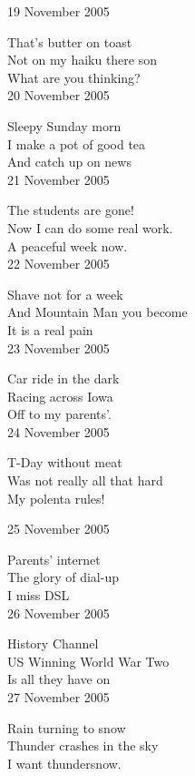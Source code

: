 \documentclass[12pt]{article}
\begin{document}
\newpage


19 November 2005

That's butter on toast \\
Not on my haiku there son \\
What are you thinking? \\

20 November 2005

Sleepy Sunday morn \\
I make a pot of good tea \\
And catch up on news \\

21 November 2005

The students are gone! \\
Now I can do some real work. \\
A peaceful week now. \\

22 November 2005

Shave not for a week \\
And Mountain Man you become \\
It is a real pain \\

23 November 2005

Car ride in the dark \\
Racing across Iowa \\
Off to my parents'. \\

24 November 2005

T-Day without meat \\
Was not really all that hard \\
My polenta rules! \\

\newpage

25 November 2005

Parents' internet \\
The glory of dial-up \\
I miss DSL \\

26 November 2005

History Channel \\
US Winning World War Two \\
Is all they have on \\

27 November 2005

Rain turning to snow \\
Thunder crashes in the sky \\
I want thundersnow. \\
\end{document}
